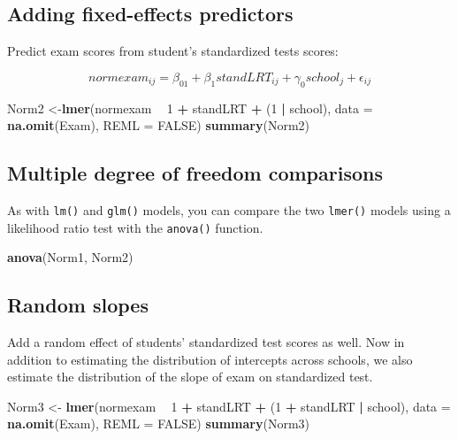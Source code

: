 \documentclass[]{book}
\newenvironment{Shaded}{\begin{snugshade}}{\end{snugshade}}
\newcommand{\KeywordTok}[1]{\textcolor[rgb]{0.13,0.29,0.53}{\textbf{#1}}}
\newcommand{\DataTypeTok}[1]{\textcolor[rgb]{0.13,0.29,0.53}{#1}}
\newcommand{\DecValTok}[1]{\textcolor[rgb]{0.00,0.00,0.81}{#1}}
\newcommand{\StringTok}[1]{\textcolor[rgb]{0.31,0.60,0.02}{#1}}
\newcommand{\OtherTok}[1]{\textcolor[rgb]{0.56,0.35,0.01}{#1}}
\newcommand{\OperatorTok}[1]{\textcolor[rgb]{0.81,0.36,0.00}{\textbf{#1}}}
\newcommand{\NormalTok}[1]{#1}
\begin{document}
\subsection{Adding fixed-effects
predictors}\label{adding-fixed-effects-predictors}

Predict exam scores from student's standardized tests scores:

\[
normexam_{ij} = \beta_01 + \beta_1standLRT_{ij} + \gamma_0school_j + \epsilon_{ij}
\]

\begin{Shaded}
\begin{Highlighting}[]
\NormalTok{  Norm2 <-}\KeywordTok{lmer}\NormalTok{(normexam }\OperatorTok{~}\StringTok{ }\DecValTok{1} \OperatorTok{+}\StringTok{ }\NormalTok{standLRT }\OperatorTok{+}\StringTok{ }\NormalTok{(}\DecValTok{1} \OperatorTok{|}\StringTok{ }\NormalTok{school),}
               \DataTypeTok{data =} \KeywordTok{na.omit}\NormalTok{(Exam), }\DataTypeTok{REML =} \OtherTok{FALSE}\NormalTok{) }
  \KeywordTok{summary}\NormalTok{(Norm2) }
\end{Highlighting}
\end{Shaded}

\subsection{Multiple degree of freedom
comparisons}\label{multiple-degree-of-freedom-comparisons}

As with \texttt{lm()} and \texttt{glm()} models, you can compare the two
\texttt{lmer()} models using a likelihood ratio test with the
\texttt{anova()} function.

\begin{Shaded}
\begin{Highlighting}[]
  \KeywordTok{anova}\NormalTok{(Norm1, Norm2)}
\end{Highlighting}
\end{Shaded}

\subsection{Random slopes}\label{random-slopes}

Add a random effect of students' standardized test scores as well. Now
in addition to estimating the distribution of intercepts across schools,
we also estimate the distribution of the slope of exam on standardized
test.

\begin{Shaded}
\begin{Highlighting}[]
\NormalTok{  Norm3 <-}\StringTok{ }\KeywordTok{lmer}\NormalTok{(normexam }\OperatorTok{~}\StringTok{ }\DecValTok{1} \OperatorTok{+}\StringTok{ }\NormalTok{standLRT }\OperatorTok{+}\StringTok{ }\NormalTok{(}\DecValTok{1} \OperatorTok{+}\StringTok{ }\NormalTok{standLRT }\OperatorTok{|}\StringTok{ }\NormalTok{school), }
                \DataTypeTok{data =} \KeywordTok{na.omit}\NormalTok{(Exam), }\DataTypeTok{REML =} \OtherTok{FALSE}\NormalTok{) }
  \KeywordTok{summary}\NormalTok{(Norm3) }
\end{Highlighting}
\end{Shaded}
\end{document}
